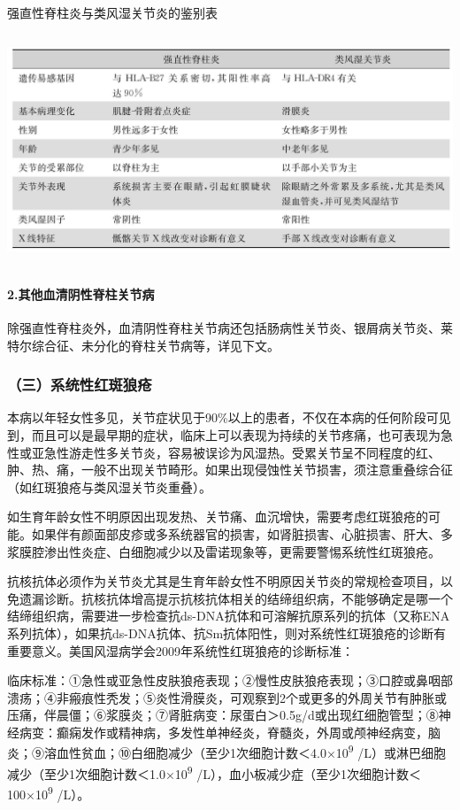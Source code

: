 \begin{table}[htbp]
\centering
\caption{强直性脊柱炎与类风湿关节炎的鉴别表}
\label{tab43-6}
\includegraphics[width=5.9375in,height=2.70833in]{./images/Image00263.jpg}
\end{table}

\paragraph{2.其他血清阴性脊柱关节病}

除强直性脊柱炎外，血清阴性脊柱关节病还包括肠病性关节炎、银屑病关节炎、莱特尔综合征、未分化的脊柱关节病等，详见下文。

\subsubsection{（三）系统性红斑狼疮}

本病以年轻女性多见，关节症状见于90\%以上的患者，不仅在本病的任何阶段可见到，而且可以是最早期的症状，临床上可以表现为持续的关节疼痛，也可表现为急性或亚急性游走性多关节炎，容易被误诊为风湿热。受累关节呈不同程度的红、肿、热、痛，一般不出现关节畸形。如果出现侵蚀性关节损害，须注意重叠综合征（如红斑狼疮与类风湿关节炎重叠）。

如生育年龄女性不明原因出现发热、关节痛、血沉增快，需要考虑红斑狼疮的可能。如果伴有颜面部皮疹或多系统器官的损害，如肾脏损害、心脏损害、肝大、多浆膜腔渗出性炎症、白细胞减少以及雷诺现象等，更需要警惕系统性红斑狼疮。

抗核抗体必须作为关节炎尤其是生育年龄女性不明原因关节炎的常规检查项目，以免遗漏诊断。抗核抗体增高提示抗核抗体相关的结缔组织病，不能够确定是哪一个结缔组织病，需要进一步检查抗ds-DNA抗体和可溶解抗原系列的抗体（又称ENA系列抗体），如果抗ds-DNA抗体、抗Sm抗体阳性，则对系统性红斑狼疮的诊断有重要意义。美国风湿病学会2009年系统性红斑狼疮的诊断标准：

临床标准：①急性或亚急性皮肤狼疮表现；②慢性皮肤狼疮表现；③口腔或鼻咽部溃疡；④非瘢痕性秃发；⑤炎性滑膜炎，可观察到2个或更多的外周关节有肿胀或压痛，伴晨僵；⑥浆膜炎；⑦肾脏病变：尿蛋白＞0.5g/d或出现红细胞管型；⑧神经病变：癫痫发作或精神病，多发性单神经炎，脊髓炎，外周或颅神经病变，脑炎；⑨溶血性贫血；⑩白细胞减少（至少1次细胞计数＜4.0×10\textsuperscript{9}
/L）或淋巴细胞减少（至少1次细胞计数＜1.0×10\textsuperscript{9}
/L），血小板减少症（至少1次细胞计数＜100×10\textsuperscript{9} /L）。

